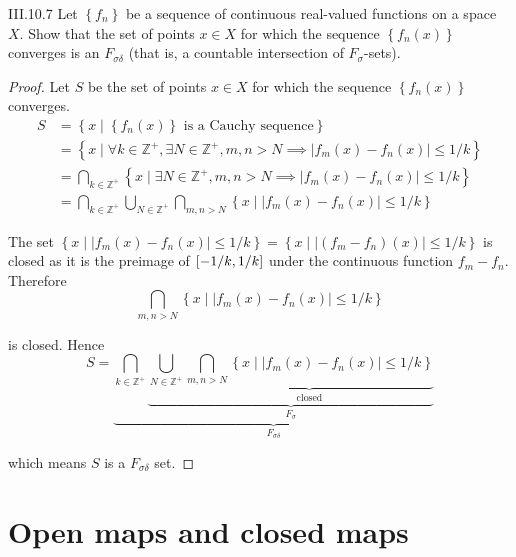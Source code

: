 \begin{problem}{III.10.7}
Let \( \left\{ f_{n} \right\} \) be a sequence of continuous real-valued functions on a space \(X\). Show that the set of points \( x \in X \) for which the sequence \( \left\{ f_{n}(x) \right\} \) converges is an \( F_{\sigma\delta} \) (that is, a countable intersection of \( F_{\sigma} \)-sets).
\end{problem}

\begin{proof}
    Let \( S \) be the set of points \( x \in X \) for which the sequence \( \left\{ f_{n}(x) \right\} \) converges.
    \begingroup
    \allowdisplaybreaks%
    \begin{align*}
        S & = \left\{ x \mid \left\{ f_{n}(x) \right\}\text{ is a Cauchy sequence} \right\}                                                                               \\
          & = \left\{ x \mid \forall k \in \mathbb{Z}^{+}, \exists N \in \mathbb{Z}^{+}, m, n > N \implies \left\vert f_{m}(x) - f_{n}(x) \right\vert \le 1/k \right\}    \\
          & = \bigcap_{k \in \mathbb{Z}^{+}} \left\{ x \mid \exists N \in \mathbb{Z}^{+}, m, n > N \implies \left\vert f_{m}(x) - f_{n}(x) \right\vert \le 1/k \right\}   \\
          & = \bigcap_{k \in \mathbb{Z}^{+}} \bigcup_{N \in \mathbb{Z}^{+}} \bigcap_{m, n > N} \left\{ x \mid \left\vert f_{m}(x) - f_{n}(x) \right\vert \le 1/k \right\}
    \end{align*}
    \endgroup

    The set \( \left\{ x \mid \left\vert f_{m}(x) - f_{n}(x) \right\vert \le 1/k \right\} = \left\{ x \mid \left\vert (f_{m} - f_{n})(x) \right\vert \le 1/k \right\} \) is closed as it is the preimage of \( \left\lbrack{-1/k, 1/k}\right\rbrack \) under the continuous function \( f_{m} - f_{n} \). Therefore
    \[
        \bigcap_{m, n > N} \left\{ x \mid \left\vert f_{m}(x) - f_{n}(x) \right\vert \le 1/k \right\}
    \]

    is closed. Hence
    \[
        S = \underbrace{\bigcap_{k \in \mathbb{Z}^{+}} \underbrace{\bigcup_{N \in \mathbb{Z}^{+}} \underbrace{\bigcap_{m, n > N} \left\{ x \mid \left\vert f_{m}(x) - f_{n}(x) \right\vert \le 1/k \right\}}_{\text{closed}}}_{F_{\sigma}}}_{F_{\sigma\delta}}
    \]

    which means \( S \) is a \( F_{\sigma\delta} \) set.
\end{proof}

\section{Open maps and closed maps}

